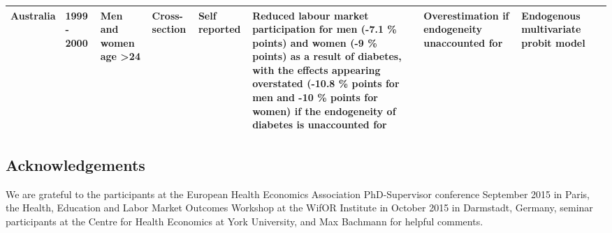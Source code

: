 \documentclass[12pt,english]{article}
\begin{document}
\begin{appendix}
{\begin{landscape}
\begin{tabularx}{\linewidth}{m m m m b b b b m}
Australia & 1999 - 2000  & Men and women age \textgreater 24                                & Cross-section           & Self reported                                & Reduced labour market participation for men (-7.1 \% points) and women (-9 \% points) as a result of diabetes, with the effects appearing overstated (-10.8 \% points for men and -10 \% points for women) if the endogeneity of diabetes is unaccounted for                                                                                                                                                                                                                                                                                                                                                                                    & Overestimation if endogeneity unaccounted for                                           & Endogenous multivariate probit model                                                                                                                                                                                                                                                                 & \textcite{Zhang2009} \\ \bottomrule
\end{tabularx}
\end{landscape}
}
\end{appendix}

\subsection*{Acknowledgements}

We are grateful to the participants at the European Health Economics Association PhD-Supervisor conference September 2015 in Paris, the Health, Education and Labor Market Outcomes Workshop at the WifOR Institute in October 2015 in Darmstadt, Germany, seminar participants at the Centre for Health Economics at York University, and Max Bachmann for helpful comments.






\printbibliography
\end{document}
